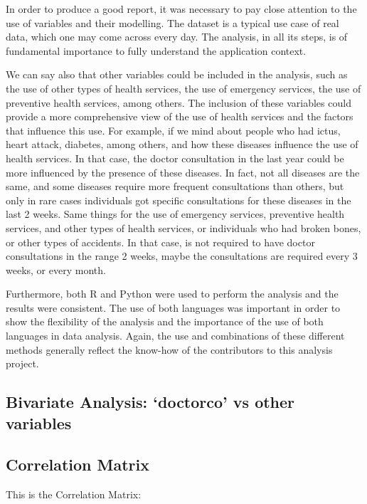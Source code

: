 \documentclass[
]{article}
\begin{document}
In order to produce a good report, it was necessary to pay close
attention to the use of variables and their modelling. The dataset is a
typical use case of real data, which one may come across every day. The
analysis, in all its steps, is of fundamental importance to fully
understand the application context.

We can say also that other variables could be included in the analysis,
such as the use of other types of health services, the use of emergency
services, the use of preventive health services, among others. The
inclusion of these variables could provide a more comprehensive view of
the use of health services and the factors that influence this use. For
example, if we mind about people who had ictus, heart attack, diabetes,
among others, and how these diseases influence the use of health
services. In that case, the doctor consultation in the last year could
be more influenced by the presence of these diseases. In fact, not all
diseases are the same, and some diseases require more frequent
consultations than others, but only in rare cases individuals got
specific consultations for these diseases in the last 2 weeks. Same
things for the use of emergency services, preventive health services,
and other types of health services, or individuals who had broken bones,
or other types of accidents. In that case, is not required to have
doctor consultations in the range 2 weeks, maybe the consultations are
required every 3 weeks, or every month.

Furthermore, both R and Python were used to perform the analysis and the
results were consistent. The use of both languages was important in
order to show the flexibility of the analysis and the importance of the
use of both languages in data analysis. Again, the use and combinations
of these different methods generally reflect the know-how of the
contributors to this analysis project.

\subsection{Bivariate Analysis: `doctorco' vs other
variables}\label{bivariate-analysis-doctorco-vs-other-variables}

\subsection{Correlation Matrix}\label{correlation-matrix}

This is the Correlation Matrix:
\end{document}
